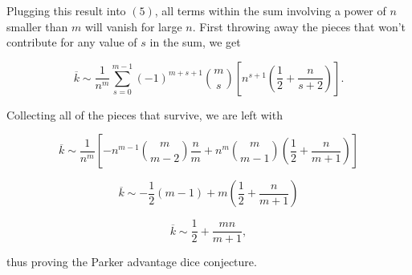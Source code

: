 \documentclass[12pt]{article}
\begin{document}
Plugging this result into $(5)$, all terms within the sum involving a power of $n$ smaller than $m$ will vanish for large $n$. First throwing away the pieces that won't contribute for any value of $s$ in the sum, we get

\begin{equation}
    \overline{k}
    \sim \frac{1}{n^m} \sum_{s=0}^{m-1} {\left(-1\right)}^{m+s+1} \binom{m}{s} \left[n^{s+1} \left(\frac{1}{2} + \frac{n}{s+2}\right) \right].
\end{equation}

Collecting all of the pieces that survive, we are left with

\begin{equation}
    \overline{k}
    \sim \frac{1}{n^m} \left[-n^{m-1} \binom{m}{m-2} \frac{n}{m} + n^m \binom{m}{m-1} \left(\frac{1}{2} + \frac{n}{m+1}\right)\right]
\end{equation}

\begin{equation}
    \overline{k}
    \sim -\frac{1}{2} \left(m-1\right) + m \left(\frac{1}{2} + \frac{n}{m+1}\right)
\end{equation}

\begin{equation}
    \overline{k}
    \sim \frac{1}{2} + \frac{mn}{m+1},
\end{equation}

thus proving the Parker advantage dice conjecture.
\end{document}
